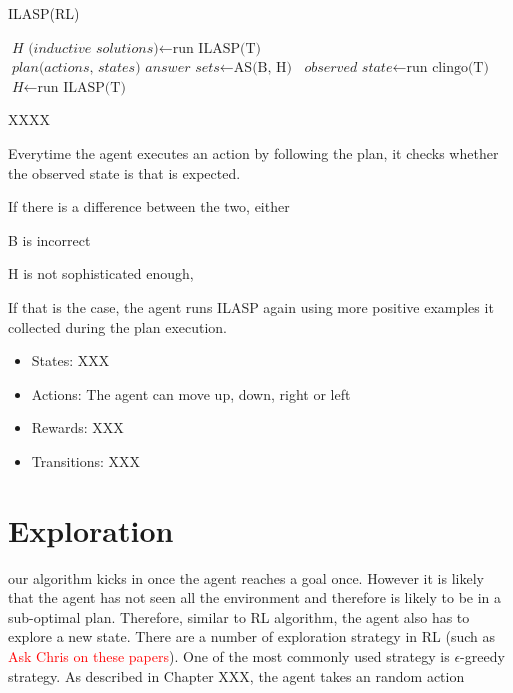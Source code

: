 \begin{algorithm}
\caption{ILASP(RL)}\label{euclid}
\begin{algorithmic}[1]


    \State $\textit{H (inductive solutions)} \gets \text{run ILASP(T)}$
    \State $\textit{plan(actions, states) answer sets} \gets \text{AS(B, H)}$
        \State $\textit{observed state} \gets \text{run clingo(T)}$
            \State $\textit{H} \gets \text{run ILASP(T)}$
            \EndIf
    \EndWhile
\EndWhile

\EndProcedure
\caption{XXXX }
\end{algorithmic}
\end{algorithm}


Everytime the agent executes an action by following the plan, it checks whether the observed state is that is expected. 

If there is a difference between the two, either

B is incorrect

H is not sophisticated enough, 

If that is the case, the agent runs ILASP again using more positive examples it collected during the plan execution. 


\begin{itemize}
\item States: XXX
\item Actions: The agent can move up, down, right or left
\item Rewards: XXX
\item Transitions: XXX
\end{itemize}

\section{Exploration}
\label{exploration}

our algorithm kicks in once the agent reaches a goal once. However it is likely that the agent has not seen all the environment
and therefore is likely to be in a sub-optimal plan. Therefore, similar to RL algorithm, the agent also has to explore a new state. 
There are a number of exploration strategy in RL (such as \textcolor{red}{Ask Chris on these papers}). 
One of the most commonly used strategy is $\epsilon$-greedy strategy. As described in Chapter XXX, the agent takes an random action 

